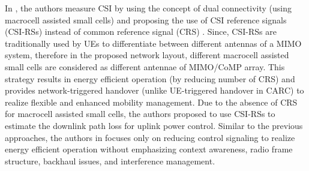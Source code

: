 \documentclass[article,10pt,twocolumn]{IEEEtran}
\begin{document}
In \citep{6825019}, the authors measure CSI by using the concept of dual connectivity (using macrocell assisted small cells) and proposing the use of CSI reference signals (CSI-RSs) instead of common reference signal (CRS) . Since, CSI-RSs are traditionally used by UEs to differentiate between different antennas of a MIMO system, therefore in the proposed network layout, different macrocell assisted small cells are considered as different antennae of MIMO/CoMP array. This strategy results in energy efficient operation (by reducing number of CRS) and provides network-triggered handover (unlike UE-triggered handover in CARC) to realize flexible and enhanced mobility management. Due to the absence of CRS for macrocell assisted small cells, the authors proposed to use CSI-RSs to estimate the downlink path loss for uplink power control. Similar to the previous approaches, the authors in \citep{6825019} focuses only on reducing control signaling to realize energy efficient operation without emphasizing context awareness, radio frame structure, backhaul issues, and interference management.
\end{document}
